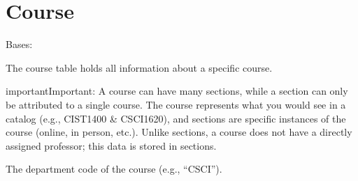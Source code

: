 \documentclass[letterpaper,10pt,english]{sphinxmanual}
\begin{document}
\section{Course}
\label{\detokenize{models/course:module-api.models.course}}\label{\detokenize{models/course:course}}\label{\detokenize{models/course::doc}}

\begin{fulllineitems}
\label{\detokenize{models/course:api.models.course.Course}}
\pysigstartsignatures
{}
\pysigstopsignatures
\sphinxAtStartPar
Bases: 

\sphinxAtStartPar
The course table holds all information about a specific course.

\begin{sphinxadmonition}{important}{Important:}
\sphinxAtStartPar
A course can have many sections, while a section can only be attributed to a single course.
The course represents what you would see in a catalog (e.g., CIST\sphinxhyphen{}1400 \& CSCI\sphinxhyphen{}1620),
and sections are specific instances of the course (online, in person, etc.).
Unlike sections, a course does not have a directly assigned professor;
this data is stored in sections.
\end{sphinxadmonition}

\begin{fulllineitems}
\label{\detokenize{models/course:api.models.course.Course.course_department}}
\pysigstartsignatures
{}
\pysigstopsignatures
\sphinxAtStartPar
The department code of the course (e.g., “CSCI”).
\begin{quote}\begin{description}
\sphinxAtStartPar
{}

\end{description}\end{quote}


\end{fulllineitems}
\end{fulllineitems}
\end{document}
